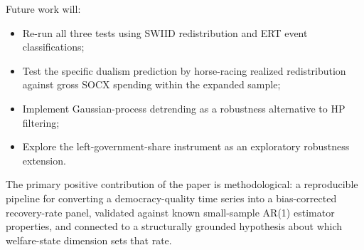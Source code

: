 \documentclass[11pt,letterpaper]{article}
\begin{document}
Future work will:
\begin{itemize}
  \item Re-run all three tests using SWIID redistribution and ERT event classifications;
  \item Test the specific dualism prediction by horse-racing realized redistribution against gross SOCX spending within
    the expanded sample;
  \item Implement Gaussian-process detrending as a robustness alternative to HP filtering;
  \item Explore the left-government-share instrument as an exploratory robustness extension.
\end{itemize}

The primary positive contribution of the paper is methodological: a reproducible pipeline for converting a
democracy-quality time series into a bias-corrected recovery-rate panel, validated against known small-sample AR(1)
estimator properties, and connected to a structurally grounded hypothesis about which welfare-state dimension sets that
rate.



\end{document}
